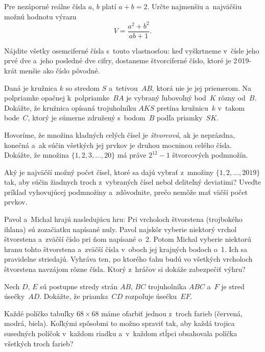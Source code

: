 {%
Pre nezáporné reálne čísla $a$, $b$ platí $a+b=2$. Určte
najmenšiu a~najväčšiu možnú hodnotu výrazu
$$
V=\frac{a^2+b^2}{ab+1}.
$$}

{%
Nájdite všetky osemciferné čísla s~touto vlastnosťou:
keď vyškrtneme v~čísle jeho prvé dve a~jeho posledné dve cifry,
dostaneme štvorciferné číslo, ktoré je 2\,019-krát menšie ako číslo
pôvodné.}

{%
Daná je kružnica $k$ so stredom $S$ a~tetivou~$AB$, ktorá
nie je jej priemerom. Na polpriamke opačnej k~polpriamke~$BA$ je
vybraný ľubovoľný bod~$K$ rôzny od~$B$. Dokážte, že kružnica
opísaná trojuholníku $AKS$ pretína kružnicu~$k$ v~takom bode~$C$, ktorý
je súmerne združený s~bodom~$B$ podľa priamky~$SK$.}

{%
Hovoríme, že množina kladných celých čísel je {\it štvorcová},
ak je neprázdna, konečná a~ak súčin všetkých jej prvkov
je druhou mocninou celého čísla. Dokážte, že množina
$\{1,2,3,\dots,20\}$ má práve $2^{12}-1$ štvorcových podmnožín.}

{%
Aký je najväčší možný počet čísel, ktoré sa dajú vybrať z~množiny
$\{1,2,\dots,2019\}$ tak, aby súčin žiadnych troch z~vybraných čísel
nebol deliteľný deviatimi? Uveďte príklad vyhovujúcej podmnožiny
a~zdôvodnite, prečo nemôže mať väčší počet prvkov.}

{%
Pavol a~Michal hrajú nasledujúcu hru: Pri vrcholoch štvorstena
(trojbokého ihlana) sú zozačiatku napísané nuly. Pavol najskôr vyberie niektorý
vrchol štvorstena a~zväčší číslo pri ňom napísané o~2. Potom Michal vyberie
niektorú hranu tohto štvorstena a~zväčší čísla v~oboch jej krajných
bodoch o~1. Ich  sa pravidelne striedajú. Vyhráva ten, po
ktorého ťahu budú vo všetkých vrcholoch štvorstena navzájom rôzne
čísla. Ktorý z~hráčov si dokáže zabezpečiť výhru?}

{%
Nech $D$, $E$ sú postupne stredy strán $AB$, $BC$ trojuholníka $ABC$
a~$F$ je stred úsečky~$AD$. Dokážte, že priamka~$CD$ rozpoľuje úsečku~$EF$.}

{%
Každé políčko tabuľky $68 \times 68$ máme ofarbiť jednou z~troch farieb
(červená, modrá, biela). Koľkými spôsobmi to možno spraviť tak,
aby každá trojica susedných políčok v~každom riadku a~v~každom stĺpci
obsahovala políčka všetkých troch farieb?}

